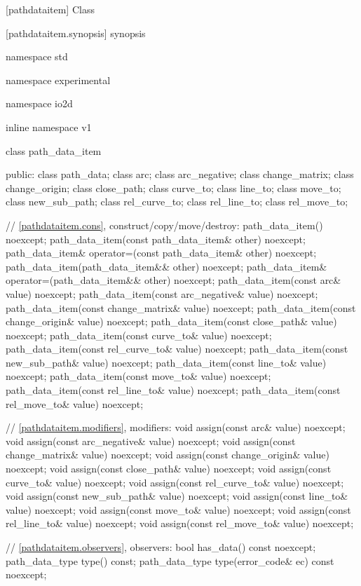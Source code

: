  [pathdataitem] {Class }

 [pathdataitem.synopsis] { synopsis}

\begin{codeblock}
namespace std { namespace experimental { namespace io2d { inline namespace v1 {
  class path_data_item {
  public:
    class path_data;
    class arc;
    class arc_negative;
    class change_matrix;
    class change_origin;
    class close_path;
    class curve_to;
    class line_to;
    class move_to;
    class new_sub_path;
    class rel_curve_to;
    class rel_line_to;
    class rel_move_to;
    
    // \ref{pathdataitem.cons}, construct/copy/move/destroy:
    path_data_item() noexcept;
    path_data_item(const path_data_item& other) noexcept;
    path_data_item& operator=(const path_data_item& other) noexcept;
    path_data_item(path_data_item&& other) noexcept;
    path_data_item& operator=(path_data_item&& other) noexcept;
    path_data_item(const arc& value) noexcept;
    path_data_item(const arc_negative& value) noexcept;
    path_data_item(const change_matrix& value) noexcept;
    path_data_item(const change_origin& value) noexcept;
    path_data_item(const close_path& value) noexcept;
    path_data_item(const curve_to& value) noexcept;
    path_data_item(const rel_curve_to& value) noexcept;
    path_data_item(const new_sub_path& value) noexcept;
    path_data_item(const line_to& value) noexcept;
    path_data_item(const move_to& value) noexcept;
    path_data_item(const rel_line_to& value) noexcept;
    path_data_item(const rel_move_to& value) noexcept;

    // \ref{pathdataitem.modifiers}, modifiers:
    void assign(const arc& value) noexcept;
    void assign(const arc_negative& value) noexcept;
    void assign(const change_matrix& value) noexcept;
    void assign(const change_origin& value) noexcept;
    void assign(const close_path& value) noexcept;
    void assign(const curve_to& value) noexcept;
    void assign(const rel_curve_to& value) noexcept;
    void assign(const new_sub_path& value) noexcept;
    void assign(const line_to& value) noexcept;
    void assign(const move_to& value) noexcept;
    void assign(const rel_line_to& value) noexcept;
    void assign(const rel_move_to& value) noexcept;

    // \ref{pathdataitem.observers}, observers:
    bool has_data() const noexcept;
    path_data_type type() const;
    path_data_type type(error_code& ec) const noexcept;

}}}}}
\end{codeblock}
